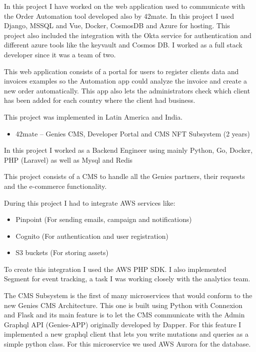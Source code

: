 \documentclass[11pt]{article}
\begin{document}
In this project I have worked on the web application used to communicate with the Order Automation tool developed also by 42mate. In this project I used Django, MSSQL and Vue, Docker, CosmosDB and Azure for hosting. This project also included the integration with the Okta service for authentication and different azure tools like the keyvault and Cosmos DB. I worked as a full stack developer since it was a team of two.

This web application consists of a portal for users to register clients data and invoices examples so the Automation app could analyze the invoice and create a new order automatically. This app also lets the administrators check which client has been added for each country where the client had business.

This project was implemented in Latin America and India.

\begin{itemize}
\item 42mate – Genies CMS, Developer Portal and CMS NFT Subsystem (2 years)
\end{itemize}

In this project I worked as a Backend Engineer using mainly Python, Go, Docker, PHP (Laravel) as well as Mysql and Redis

This project consists of a CMS to handle all the Genies partners, their requests and the e-commerce functionality.

During this project I had to integrate AWS services like:
\begin{itemize}
\item Pinpoint (For sending emails, campaign and notifications)
\item Cognito (For authentication and user registration)
\item S3 buckets (For storing assets)
\end{itemize}

To create this integration I used the AWS PHP SDK. I also implemented Segment for event tracking, a task I was working closely with the analytics team.

The CMS Subsystem is the first of many microservices that would conform to the new Genies CMS Architecture. This one is built using Python with Connexion and Flask and its main feature is to let the CMS communicate with the Admin Graphql API (Genies-APP) originally developed by Dapper. For this feature I implemented a new graphql client that lets you write mutations and queries as a simple python class.
For this microservice we used AWS Aurora for the database.
\end{document}
